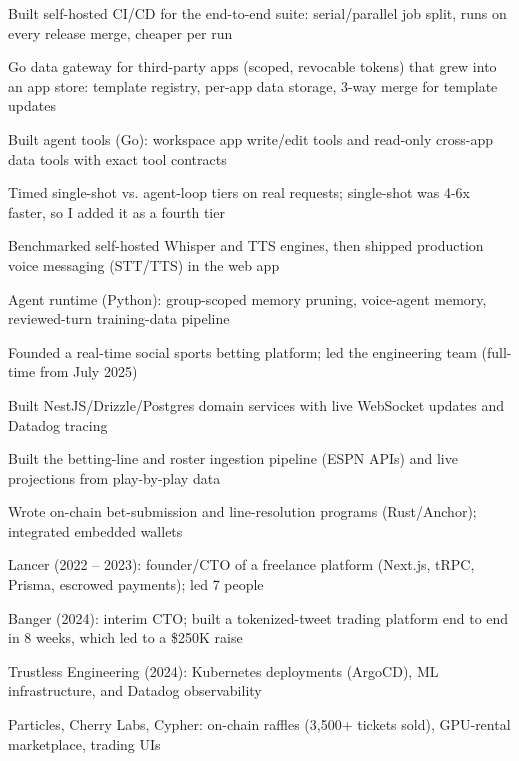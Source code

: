 \documentclass[print]{jack-resume}
\begin{document}
\begin{tightemize}
    \item Built self-hosted CI/CD for the end-to-end suite: serial/parallel job split, runs on every release merge, cheaper per run
    \item Go data gateway for third-party apps (scoped, revocable tokens) that grew into an app store: template registry, per-app data storage, 3-way merge for template updates
    \item Built agent tools (Go): workspace app write/edit tools and read-only cross-app data tools with exact tool contracts
    \item Timed single-shot vs. agent-loop tiers on real requests; single-shot was 4-6x faster, so I added it as a fourth tier
    \item Benchmarked self-hosted Whisper and TTS engines, then shipped production voice messaging (STT/TTS) in the web app
    \item Agent runtime (Python): group-scoped memory pruning, voice-agent memory, reviewed-turn training-data pipeline
\end{tightemize}
\sectionsep

\begin{tightemize}
    \item Founded a real-time social sports betting platform; led the engineering team (full-time from July 2025)
    \item Built NestJS/Drizzle/Postgres domain services with live WebSocket updates and Datadog tracing
    \item Built the betting-line and roster ingestion pipeline (ESPN APIs) and live projections from play-by-play data
    \item Wrote on-chain bet-submission and line-resolution programs (Rust/Anchor); integrated embedded wallets
\end{tightemize}
\sectionsep

\begin{tightemize}
    \item Lancer (2022 – 2023): founder/CTO of a freelance platform (Next.js, tRPC, Prisma, escrowed payments); led 7 people
    \item Banger (2024): interim CTO; built a tokenized-tweet trading platform end to end in 8 weeks, which led to a \$250K raise
    \item Trustless Engineering (2024): Kubernetes deployments (ArgoCD), ML infrastructure, and Datadog observability
    \item Particles, Cherry Labs, Cypher: on-chain raffles (3,500+ tickets sold), GPU-rental marketplace, trading UIs
\end{tightemize}
\sectionsep
\end{document}
